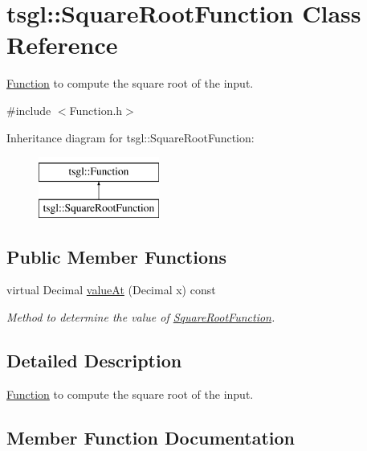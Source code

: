 \hypertarget{classtsgl_1_1_square_root_function}{}\section{tsgl\+:\+:Square\+Root\+Function Class Reference}
\label{classtsgl_1_1_square_root_function}


\hyperlink{classtsgl_1_1_function}{Function} to compute the square root of the input.  




{\ttfamily \#include $<$Function.\+h$>$}

Inheritance diagram for tsgl\+:\+:Square\+Root\+Function\+:\begin{figure}[H]
\begin{center}
\leavevmode
\includegraphics[height=2.000000cm]{classtsgl_1_1_square_root_function}
\end{center}
\end{figure}
\subsection*{Public Member Functions}
\begin{DoxyCompactItemize}
\item 
virtual Decimal \hyperlink{classtsgl_1_1_square_root_function_a25f6192ef7b12b80c4a14186e1cde97c}{value\+At} (Decimal x) const 
\begin{DoxyCompactList}\small\item\em Method to determine the value of \hyperlink{classtsgl_1_1_square_root_function}{Square\+Root\+Function}. \end{DoxyCompactList}\end{DoxyCompactItemize}


\subsection{Detailed Description}
\hyperlink{classtsgl_1_1_function}{Function} to compute the square root of the input. 

\subsection{Member Function Documentation}
\hypertarget{classtsgl_1_1_square_root_function_a25f6192ef7b12b80c4a14186e1cde97c}{}
